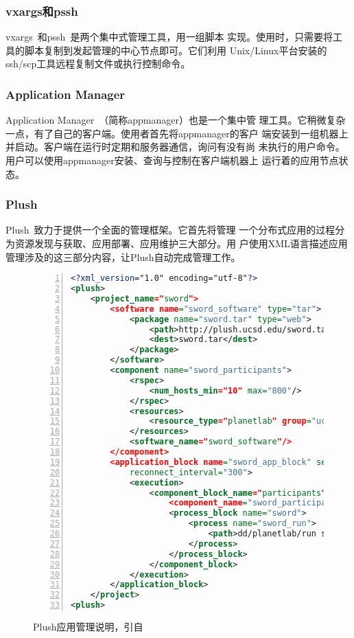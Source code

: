 
\subsubsection*{vxargs和pssh}

vxargs~\cite{vxargs}和pssh~\cite{pssh}是两个集中式管理工具，用一组脚本
实现。使用时，只需要将工具的脚本复制到发起管理的中心节点即可。它们利用
Unix/Linux平台安装的ssh/scp工具远程复制文件或执行控制命令。

\subsubsection*{Application Manager}

Application Manager~\cite{appmanager}（简称appmanager）也是一个集中管
理工具。它稍微复杂一点，有了自己的客户端。使用者首先将appmanager的客户
端安装到一组机器上并启动。客户端在运行时定期和服务器通信，询问有没有尚
未执行的用户命令。用户可以使用appmanager安装、查询与控制在客户端机器上
运行着的应用节点状态。

\subsubsection*{Plush}

Plush~\cite{plush}致力于提供一个全面的管理框架。它首先将管理
一个分布式应用的过程分为资源发现与获取、应用部署、应用维护三大部分。用
户使用XML语言描述应用管理涉及的这三部分内容，让Plush自动完成管理工作。

\begin{figure}
\centering
\begin{lstlisting}[language=XML,numbers=left]
<?xml_version="1.0" encoding="utf-8"?>
<plush>
    <project_name="sword">
        <software name="sword_software" type="tar">
            <package name="sword.tar" type="web">
                <path>http://plush.ucsd.edu/sword.tar</path>
                <dest>sword.tar</dest>
            </package>
        </software>
        <component name="sword_participants">
            <rspec>
                <num_hosts_min="10" max="800"/>
            </rspec>
            <resources>
                <resource_type="planetlab" group="ucsd_sword"/>
            </resources>
            <software_name="sword_software"/>
        </component>
        <application_block name="sword_app_block" service="1"
            reconnect_interval="300">
            <execution>
                <component_block_name="participants">
                    <component_name="sword_participants"/>
                    <process_block name="sword">
                        <process name="sword_run">
                            <path>dd/planetlab/run sword</path>
                        </process>
                    </process_block>
                </component_block>
            </execution>
        </application_block>
    </project>
<plush>
\end{lstlisting}
\caption{Plush应用管理说明，引自~\cite{plush}}
\label{fig:plush_spec}
\end{figure}



